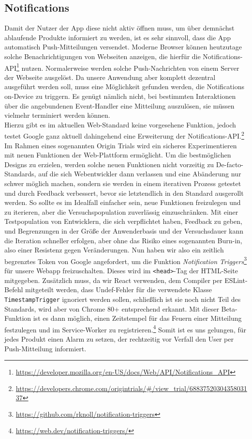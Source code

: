\subsection{Notifications}
Damit der Nutzer der App diese nicht aktiv öffnen muss, um über demnächst ablaufende Produkte informiert zu werden, ist es sehr sinnvoll, dass die App automatisch Push-Mitteilungen versendet. Moderne Browser können heutzutage solche Benachrichtigungen von Webseiten anzeigen, die hierfür die Notifications-API\footnote{\url{https://developer.mozilla.org/en-US/docs/Web/API/Notifications_API}} nutzen. 
Normalerweise werden solche Push-Nachrichten von einem Server der Webseite ausgelöst. Da unsere Anwendung aber komplett dezentral ausgeführt werden soll, muss eine Möglichkeit gefunden werden, die Notifications on-Device zu triggern. Es genügt nämlich nicht, bei bestimmten Interaktionen über die angebundenen Event-Handler eine Mitteilung auszulösen, sie müssen vielmehr terminiert werden können.\\
Hierzu gibt es im aktuellen Web-Standard keine vorgesehene Funktion, jedoch testet Google ganz aktuell dahingehend eine Erweiterung der Notifications-API.\footnote{\url{https://developers.chrome.com/origintrials/#/view_trial/6883752030435803137}}
Im Rahmen eines sogenannten Origin Trials wird ein sicheres Experimentieren mit neuen Funktionen der Web-Plattform ermöglicht. Um die bestmöglichen Designs zu erzielen, werden solche neuen Funktionen nicht vorzeitig zu De-facto-Standards, auf die sich Webentwickler dann verlassen und eine Abänderung nur schwer möglich machen, sondern sie werden in einem iterativen Prozess getestet und durch Feedback verbessert, bevor sie letztendlich in den Standard ausgerollt werden.
So sollte es im Idealfall einfacher sein, neue Funktionen freizulegen und zu iterieren, aber die Versuchspopulation zuverlässig einzuschränken. Mit einer Testpopulation von Entwicklern, die sich verpflichtet haben, Feedback zu geben, und Begrenzungen in der Größe der Anwenderbasis und der Versuchsdauer kann die Iteration schneller erfolgen, aber ohne das Risiko eines sogenannten Burn-in, also einer Resistenz gegen Veränderungen.
Nun haben wir also ein zeitlich begrenztes Token von Google angefordert, um die Funktion \emph{Notification Triggers}\footnote{\url{https://github.com/rknoll/notification-triggers}} für unsere Webapp freizuschalten. Dieses wird im \texttt{<head>}-Tag der \ac{HTML}-Seite mitgegeben. Zusätzlich muss, da wir React verwenden, dem Compiler per ESLint-Befehl mitgeteilt werden, dass Undef-Fehler für die verwendete Klasse \texttt{TimestampTrigger} ignoriert werden sollen, schließlich ist sie noch nicht Teil des Standards, wird aber von Chrome 80+ entsprechend erkannt. Mit dieser Beta-Funktion ist es dann möglich, einen Zeitstempel für das Feuern einer Mitteilung festzulegen und im Service-Worker zu registrieren.\footnote{\url{https://web.dev/notification-triggers/}} Somit ist es uns gelungen, für jedes Produkt einen Alarm zu setzen, der rechtzeitig vor Verfall den User per Push-Mitteilung informiert.